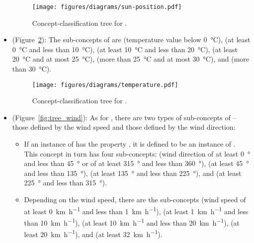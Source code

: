 \begin{itemize}
  \begin{figure}
    \centering
    \texttt{[image: figures/diagrams/sun-position.pdf]}
    \caption[Concept-classification tree for ]{Concept-classification tree for .}
    \label{fig:tree_sun_position}
  \end{figure}

  \item {} (Figure~\ref{fig:tree_temperature}): The sub-concepts of  are  (temperature value below \SI{0}{\celsius}),  (at least \SI{0}{\celsius} and less than \SI{10}{\celsius}),  (at least \SI{10}{\celsius} and less than \SI{20}{\celsius}),  (at least \SI{20}{\celsius} and at most \SI{25}{\celsius}),  (more than \SI{25}{\celsius} and at most \SI{30}{\celsius}), and  (more than \SI{30}{\celsius}).
  
  \begin{figure}
    \centering
    \texttt{[image: figures/diagrams/temperature.pdf]}
    \caption[Concept-classification tree for ]{Concept-classification tree for .}
    \label{fig:tree_temperature}
  \end{figure}

  \item {} (Figure~\ref{fig:tree_wind}): As for , there are two types of sub-concepts of  -- those defined by the wind speed and those defined by the wind direction:
    \begin{itemize}
      \item If an instance of  has the property , it is defined to be an instance of . This concept in turn has four sub-concepts:  (wind direction of at least \SI{0}{\degree} and less than \SI{45}{\degree} or of at least \SI{315}{\degree} and less than \SI{360}{\degree}),  (at least \SI{45}{\degree} and less than \SI{135}{\degree}),  (at least \SI{135}{\degree} and less than \SI{225}{\degree}), and  (at least \SI{225}{\degree} and less than \SI{315}{\degree}).
      
      \item Depending on the wind speed, there are the sub-concepts  (wind speed of at least \SI{0}{\kilo\metre\per\hour} and less than \SI{1}{\kilo\metre\per\hour}),  (at least \SI{1}{\kilo\metre\per\hour} and less than \SI{10}{\kilo\metre\per\hour}),  (at least \SI{10}{\kilo\metre\per\hour} and less than \SI{20}{\kilo\metre\per\hour}),  (at least \SI{20}{\kilo\metre\per\hour}), and  (at least \SI{32}{\kilo\metre\per\hour}).
      

\end{itemize}
\end{itemize}
